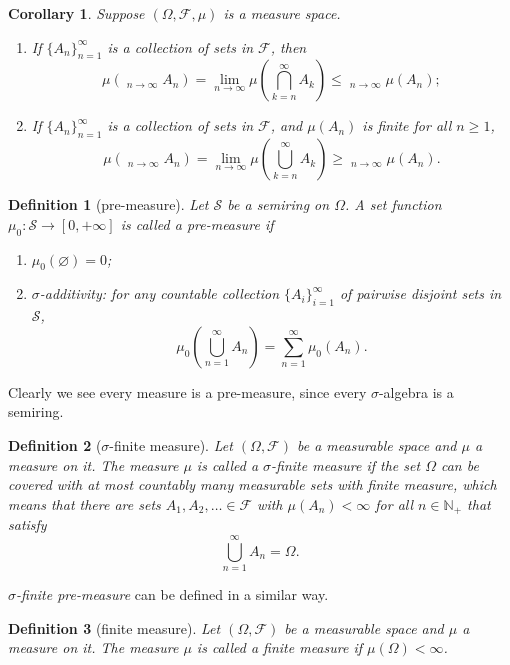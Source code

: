 \documentclass{report}
\newtheorem{definition}{Definition}[section]
\newtheorem{corollary}{Corollary}[section]
\theoremstyle{nonumberplain}
\DeclareMathOperator*\lowlim{\underline{lim}}
\DeclareMathOperator*\uplim{\overline{lim}}
\begin{document}
\begin{corollary}
	Suppose $(\Omega,\mathcal{F},\mu)$ is a measure space. 
	\begin{enumerate}
		\item If $\{A_{n}\}_{n=1}^{\infty}$ is a collection of sets in $\mathcal{F}$, then 
		$$
		\mu\left(\lowlim_{n\to\infty} A_{n}\right)=\lim_{n \rightarrow \infty} \mu\left(\bigcap_{k=n}^\infty A_{k}\right)\le \lowlim_{n\to\infty} \mu\left(A_{n}\right);
		$$
		\item If $\{A_{n}\}_{n=1}^{\infty}$ is a collection of sets in $\mathcal{F}$, and $\mu(A_{n})$ is finite for all $n\ge 1$,
		$$
		\mu\left(\uplim_{n\to\infty} A_{n}\right)=\lim_{n \rightarrow \infty} \mu\left(\bigcup_{k=n}^\infty A_{k}\right)\ge \uplim_{n\to\infty} \mu\left(A_{n}\right).
		$$
	\end{enumerate}
\end{corollary}

\begin{definition}[pre-measure]
	Let $\mathcal{S}$ be a semiring on $\Omega$. A set function $\mu_0:\mathcal{S}\to[0,+\infty]$  is called a \emph{pre-measure} if
	\begin{enumerate}
		\item[(a)]$\mu_0(\varnothing) = 0$;
		\item[(b)]$\sigma$-additivity: for any countable collection $\{A_{i}\}_{i=1}^{\infty }$ of pairwise disjoint sets in $\mathcal{S}$,
		\[
		\mu_0\left(\bigcup_{n=1}^\infty A_n\right)=\sum_{n=1}^{\infty}\mu_0(A_n).
		\]
	\end{enumerate}
\end{definition}

Clearly we see every measure is a pre-measure, since every $\sigma$-algebra is a semiring.

\begin{definition}[$\sigma$-finite measure]
	Let $(\Omega,{\mathcal {F}})$ be a measurable space and $\mu$ a measure on it. The measure $\mu$ is called a \emph{$\sigma$-finite measure} if the set $\Omega$ can be covered with at most countably many measurable sets with finite measure, which means that there are sets $A_{1},A_{2},\ldots \in {\mathcal {F}}$ with $\mu \left(A_{n}\right)<\infty$ for all $n\in \mathbb {N_+}$ that satisfy 
	\[
	\bigcup_{n=1}^{\infty}A_{n}=\Omega.
	\]
\end{definition}
\emph{$\sigma$-finite pre-measure} can be defined in a similar way. 

\begin{definition}[finite measure]
	Let $(\Omega,{\mathcal {F}})$ be a measurable space and $\mu$ a measure on it. The measure $\mu$ is called a \emph{finite measure} if $\mu(\Omega)<\infty$.
\end{definition}
\end{document}
